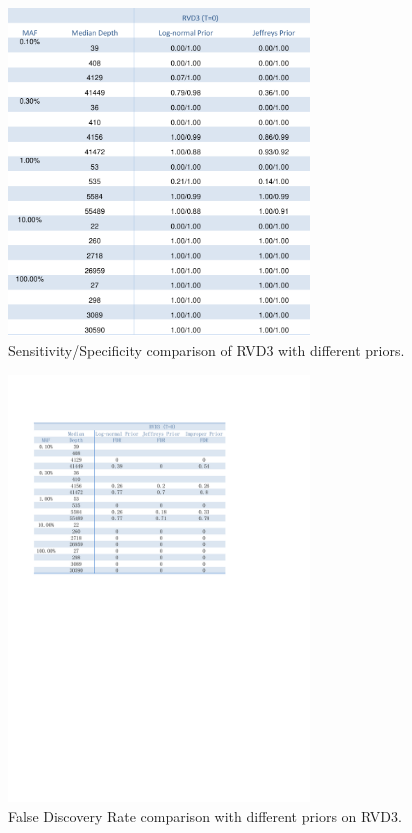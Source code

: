 \documentclass[11pt,reqno]{amsart}
\begin{document}
\begin{figure}[htbp]
\begin{center}
\includegraphics[width=80mm]{tables/Sen_Speci.pdf}
\caption{Sensitivity/Specificity comparison of RVD3 with different priors.}
\label{fig:SS}
\end{center}
\end{figure}


\begin{figure}[htbp]
\begin{center}
\includegraphics[width=80mm]{tables/FDR.pdf}
\caption{False Discovery Rate comparison with different priors on RVD3.}
\label{fig:fdr}
\end{center}
\end{figure}
\end{document}
